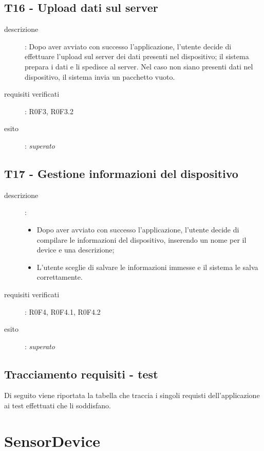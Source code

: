 \subsection{T16 - Upload dati sul server}
\begin{description}
\item[descrizione]: Dopo aver avviato con successo l'applicazione, l'utente decide di effettuare l'upload sul server dei dati presenti nel dispositivo; il sistema prepara i dati e li spedisce al server.
Nel caso non siano presenti dati nel dispositivo, il sistema invia un pacchetto vuoto.
\item[requisiti verificati]: R0F3, R0F3.2
\item[esito]: \emph{superato}
\end{description}

\subsection{T17 - Gestione informazioni del dispositivo}
\begin{description}
\item[descrizione]: \hfill
	\begin{itemize}
	\item Dopo aver avviato con successo l'applicazione, l'utente decide di compilare le informazioni del dispositivo, inserendo un nome per il device e una descrizione;
	\item L'utente sceglie di salvare le informazioni immesse e il sistema le salva correttamente.
	\end{itemize}
\item[requisiti verificati]: R0F4, R0F4.1, R0F4.2
\item[esito]: \emph{superato}
\end{description}

\subsection{Tracciamento requisiti - test}
Di seguito viene riportata la tabella che traccia i singoli requisti dell'applicazione ai test effettuati che li soddisfano.


\section{SensorDevice}

